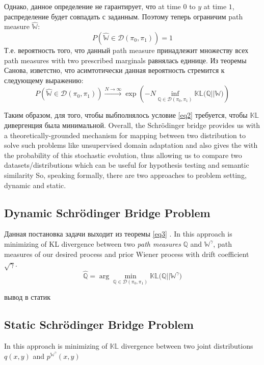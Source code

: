 \documentclass{article}
\begin{document}
Однако, данное определение не гарантирует, что at time $0$ to $y$ at time $1$, распределение будет совпадать с заданным. Поэтому теперь ограничим path measure $\hat{\mathbb{W}}$:
\begin{equation} \label{eq2}
    P\left(\hat{\mathbb{W}} \in \mathcal{D}(\pi_0, \pi_1)\right)=1
\end{equation}
Т.е. вероятность того, что данный path measure принадлежит множеству всех path measures with two prescribed marginals равнялась единице. Из теоремы Санова, изветстно, что асимтотически данная вероятность стремится к следующему выражению:
\begin{equation} \label{eq3}
    P\left(\hat{\mathbb{W}} \in \mathcal{D}(\pi_0, \pi_1)\right) \xrightarrow{N\rightarrow \infty} \exp\left(-N\inf_{\mathbb{Q} \in \mathcal{D}(\pi_0, \pi_1)}\mathbb{KL(Q||W})\right)
\end{equation}

Таким образом, для того, чтобы выбполнялось условие \ref{eq2} требуется, чтобы $\mathbb{KL}$ дивергенция была минимальной.
Overall, the Schrödinger bridge provides us with a theoretically-grounded mechanism for mapping between two distribution to solve such problems like unsupervised domain adaptation and also gives the with the probability of this stochastic evolution, thus allowing us to compare two datasets/distributions which can be useful for hypothesis testing and semantic similarity
So, speaking formally, there are two approaches to problem setting, dynamic and static.
\subsection{Dynamic Schrödinger Bridge Problem}
Данная постановка задачи выходит из теоремы \ref{eq3} . In this approach is minimizing of KL divergence between two \textit{path measures} $\mathbb{Q}$ and $\mathbb{W}^\gamma$, path measures of our desired process and prior Wiener process with drift coefficient $\sqrt\gamma$.
\begin{equation}
    \hat{\mathbb{Q}} = \arg\min_{\mathbb{Q}\in \mathcal{D}(\pi_0, \pi_1)} \mathbb{KL(Q||W}^\gamma)
\end{equation}

вывод в статик
\subsection{Static Schrödinger Bridge Problem}
In this approach is minimizing of $\mathbb{KL}$ divergence between two joint distributions $q(x,y)$ and $p^{\mathbb{W}^\gamma}(x,y)$
\end{document}
